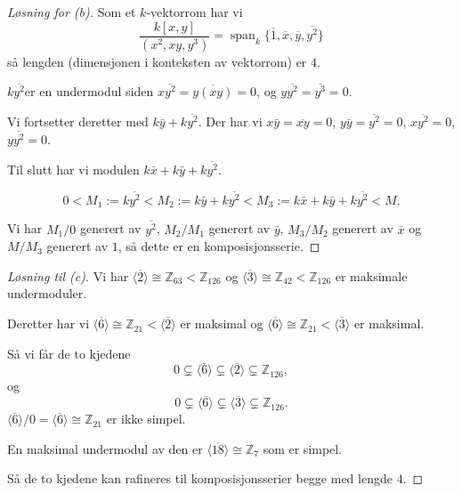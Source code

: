 \begin{proof}[Løsning for (b)]
    Som et $k$-vektorrom har vi 
    \[
        \frac{k[x,y]}{(x^2, xy, y^3)} 
        = \operatorname{span}_k\{\overline 1, \overline x, 
        \overline y, \overline{y^2}\}
    \]
    så lengden (dimensjonen i konteksten av vektorrom) 
    er $4$. 

    $k \overline{y^2}$er en undermodul siden 
    $x\overline{y^2} = \overline{y(xy)} = 0$,
    og $y\overline{y^2} = \overline{y^3} = 0$. 

    Vi fortsetter deretter med $k\bar y + k\overline{y^2}$. 
    Der har vi $x\bar y = \overline{xy} = 0$, 
    $y\bar y = \overline{y^2} = 0$, 
    $x\overline{y^2} = 0$, $y\overline{y^2} = 0$. 

    Til slutt har vi modulen 
    $k\bar x + k\bar y + k \overline{y^2}$. 

    \[
        0
        <
        M_1 := k\overline{y^2}
        <
        M_2 := k\bar y+k\overline{y^2}
        <
        M_3 := k\bar x+k\bar y+k\overline{y^2}
        <
        M.
    \]

    Vi har $M_1/0$ generert av $\overline{y^2}$, 
    $M_2/M_1$ generert av $\bar y$, $M_3/M_2$ generert av 
    $\bar x$ og $M/M_3$ generert av $1$, så 
    dette er en komposisjonsserie. 
\end{proof}

\begin{proof}[Løsning til (c)]
    Vi har $\langle \overline 2 \rangle \cong 
    \mathbb Z_{63}< \mathbb Z_{126}$ 
    og $\langle \overline 3 \rangle \cong 
    \mathbb Z_{42} < \mathbb Z_{126}$ er maksimale undermoduler. 

        Deretter har vi $\langle \overline 6 \rangle 
        \cong \mathbb Z_{21} < \langle \overline 2 \rangle$ 
        er maksimal og 
        $\langle \overline 6 \rangle \cong 
        \mathbb Z_{21} < \langle \overline 3 
        \rangle $ 
        er maksimal. 

        Så vi får de to kjedene 
        \[
            0 \subsetneq \langle \overline 6 \rangle 
            \subsetneq \langle \overline 2 \rangle 
            \subsetneq \mathbb Z_{126},
        \]
        og 
        \[
            0 \subsetneq \langle \overline 6 \rangle 
            \subsetneq \langle \overline 3 \rangle 
            \subsetneq \mathbb Z_{126}.
        \]
        $\langle \overline 6 \rangle / 0 = \langle \overline 6 
        \rangle \cong \mathbb Z_{21}$ er ikke simpel.  

        En maksimal undermodul av den er $\langle \overline{18} 
        \rangle \cong \mathbb Z_{7}$ som er simpel. 

        Så de to kjedene kan rafineres 
        til komposisjonsserier 
        begge med lengde $4$. 
\end{proof}

